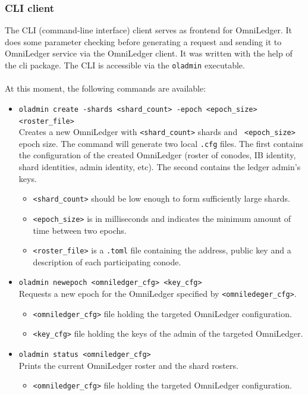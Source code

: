 \subsubsection{CLI client}
The CLI (command-line interface) client serves as frontend for OmniLedger. It does some parameter checking before generating a request and sending it to OmniLedger service via the OmniLedger client. It was written with the help of the cli\cite{cli} package. The CLI is accessible via the \texttt{oladmin} executable. \\\\
At this moment, the following commands are available:
\begin{itemize}
	\item \texttt{oladmin create -shards <shard\_count> -epoch <epoch\_size> <roster\_file>} \\
	Creates a new OmniLedger with \texttt{<shard\_count>} shards and \texttt{ <epoch\_size>} epoch size. The command will generate two local \texttt{.cfg} files. The first contains the configuration of the created OmniLedger (roster of conodes, IB identity, shard identities, admin identity, etc). The second contains the ledger admin's keys.
	\begin{itemize}
		\item \texttt{<shard\_count>} should be low enough to form sufficiently large shards.
		\item \texttt{<epoch\_size>} is in milliseconds and indicates the minimum amount of time between two epochs.
		\item \texttt{<roster\_file>} is a \texttt{.toml} file containing the address, public key and a description of each participating conode. 
	\end{itemize}
	\item \texttt{oladmin newepoch <omniledger\_cfg> <key\_cfg>}\\
	Requests a new epoch for the OmniLedger specified by \texttt{<omniledeger\_cfg>}.
	\begin{itemize}
		\item \texttt{<omniledger\_cfg>} file holding the targeted OmniLedger configuration.
		\item \texttt{<key\_cfg>} file holding the keys of the admin of the targeted OmniLedger.
	\end{itemize}
	\item \texttt{oladmin status <omniledger\_cfg>}\\
	Prints the current OmniLedger roster and the shard rosters.
	\begin{itemize}
		\item \texttt{<omniledger\_cfg>} file holding the targeted OmniLedger configuration.
	\end{itemize}
\end{itemize}

